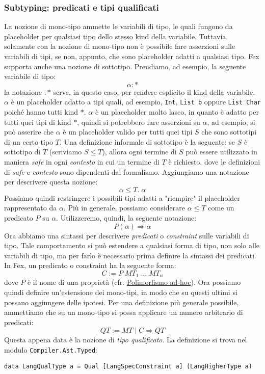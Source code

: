 \documentclass[10pt,a4paper]{article}
\begin{document}
\hypertarget{Subtyping: predicati e tipi qualificati}{\subsubsection{Subtyping: predicati e tipi qualificati}}
La nozione di mono-tipo ammette le variabili di tipo, le quali fungono da placeholder per qualsiasi tipo dello stesso
kind della variabile. Tuttavia, solamente con la nozione di mono-tipo non è possibile fare asserzioni sulle variabili
di tipi, se non, appunto, che sono placeholder adatti a qualsiasi tipo. Fex supporta anche una nozione di sottotipo.
Prendiamo, ad esempio, la seguente variabile di tipo:
\[ \alpha : * \]
la notazione $ : * $ serve, in questo caso, per rendere esplicito il kind della variabile. $ \alpha $ è un placeholder
adatto a tipi quali, ad esempio, \texttt{Int}, \texttt{List b} oppure \texttt{List Char} poiché hanno tutti kind $ * $.
$ \alpha $ è un placeholder molto lasco, in quanto è adatto per tutti quei tipi di kind $ * $, quindi si potrebbero fare
asserzioni su $ \alpha $, ad esempio, si può asserire che $ \alpha $ è un placeholder
valido per tutti quei tipi $ S $ che sono sottotipi di un certo tipo $ T $. Una definizione informale di sottotipo è la
seguente: se $ S $ è sottotipo di $ T $ (scriviamo $ S \leq T $), allora ogni termine di $ S $ può essere utilizzato
in maniera \textit{safe} in ogni \textit{contesto} in cui un termine di $ T $ è richiesto, dove le definizioni di
\textit{safe} e \textit{contesto} sono dipendenti dal formalismo.
Aggiungiamo una notazione per descrivere questa nozione:
\[ \alpha \leq T . \; \alpha \]
Possiamo quindi restringere i possibili tipi adatti a "riempire" il placeholder rappresentato da $ \alpha $. Più in
generale, possiamo considerare $ \alpha \leq T $ come un predicato $ P $ su $ \alpha $. Utilizzeremo, quindi, la seguente
notazione:
\[ P(\alpha) \Rightarrow \alpha \]
Ora abbiamo una sintassi per descrivere \textit{predicati} o \textit{constraint} sulle variabili di tipo. Tale
comportamento si può estendere a qualsiasi forma di tipo, non solo alle variabili di tipo, ma per farlo è necessario
prima definire la sintassi dei predicati. In Fex, un predicato o constraint ha la seguente forma:
\[ C := P \; MT_1 \; ... \; MT_n \]
dove $ P $ è il nome di una proprietà (cfr. \hyperlink{Polimorfismo ad-hoc}{Polimorfismo ad-hoc}). Ora possiamo quindi
definire un'estensione dei
mono-tipi, in modo che su questi ultimi si possano aggiungere delle ipotesi. Per una definizione più generale possibile,
ammettiamo che su un mono-tipo si possa applicare un numero arbitrario di predicati:
\[ QT := MT \; | \; C \Rightarrow QT \]
Questa appena data è la nozione di \textit{tipo qualificato}. La definizione si trova nel modulo
\texttt{Compiler.Ast.Typed}:
\begin{lstlisting}
data LangQualType a = Qual [LangSpecConstraint a] (LangHigherType a)
\end{lstlisting}
\end{document}
